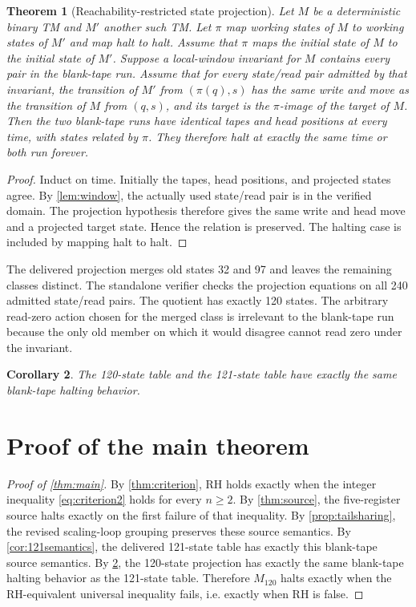 \documentclass[10pt]{article}
\newtheorem{theorem}{Theorem}[section]
\newtheorem{corollary}[theorem]{Corollary}
\theoremstyle{definition}
\begin{document}
\begin{theorem}[Reachability-restricted state projection]
\label{thm:projection}
Let $M$ be a deterministic binary TM and $M'$ another such TM. Let $\pi$ map
working states of $M$ to working states of $M'$ and map halt to halt. Assume
that $\pi$ maps the initial state of $M$ to the initial state of $M'$. Suppose
a local-window invariant for $M$ contains every pair in the blank-tape run.
Assume that for every state/read pair admitted by that invariant, the
transition of $M'$ from $(\pi(q),s)$ has the same write and move as the
transition of $M$ from $(q,s)$, and its target is the $\pi$-image of the
target of $M$. Then the two blank-tape runs have identical tapes and head
positions at every time, with states related by $\pi$. They therefore halt at
exactly the same time or both run forever.
\end{theorem}

\begin{proof}
Induct on time. Initially the tapes, head positions, and projected states
agree. By \cref{lem:window}, the actually used state/read pair is in the
verified domain. The projection hypothesis therefore gives the same write and
head move and a projected target state. Hence the relation is preserved. The
halting case is included by mapping halt to halt.
\end{proof}

The delivered projection merges old states 32 and 97 and leaves the remaining
classes distinct. The standalone verifier checks the projection equations on
all 240 admitted state/read pairs. The quotient has exactly 120 states. The
arbitrary read-zero action chosen for the merged class is irrelevant to the
blank-tape run because the only old member on which it would disagree cannot
read zero under the invariant.

\begin{corollary}
\label{cor:120eq121}
The 120-state table and the 121-state table have exactly the same blank-tape
halting behavior.
\end{corollary}

\section{Proof of the main theorem}

\begin{proof}[Proof of \cref{thm:main}]
By \cref{thm:criterion}, RH holds exactly when the integer inequality
\eqref{eq:criterion2} holds for every $n\ge2$. By \cref{thm:source}, the
five-register source halts exactly on the first failure of that inequality.
By \cref{prop:tailsharing}, the revised scaling-loop grouping preserves these
source semantics. By \cref{cor:121semantics}, the delivered 121-state table has exactly this
blank-tape source semantics. By \cref{cor:120eq121}, the 120-state projection
has exactly the same blank-tape halting behavior as the 121-state table.
Therefore $M_{120}$ halts exactly when the RH-equivalent universal inequality
fails, i.e. exactly when RH is false.
\end{proof}
\end{document}
